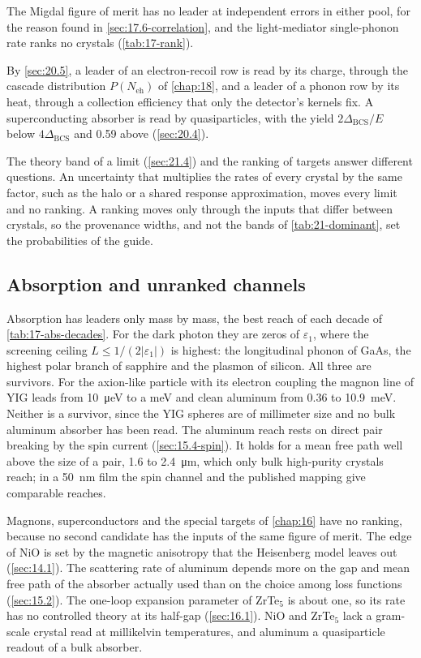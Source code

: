 The Migdal figure of merit has no leader at independent errors in either pool, for the reason found in \cref{sec:17.6-correlation}, and the light-mediator single-phonon rate ranks no crystals (\cref{tab:17-rank}).

By \cref{sec:20.5}, a leader of an electron-recoil row is read by its charge, through the cascade distribution $P(N_{\mathrm{eh}})$ of \cref{chap:18}, and a leader of a phonon row by its heat, through a collection efficiency that only the detector's kernels fix. A superconducting absorber is read by quasiparticles, with the yield $2\Delta_{\mathrm{BCS}}/E$ below $4\Delta_{\mathrm{BCS}}$ and 0.59 above (\cref{sec:20.4}).

The theory band of a limit (\cref{sec:21.4}) and the ranking of targets answer different questions. An uncertainty that multiplies the rates of every crystal by the same factor, such as the halo or a shared response approximation, moves every limit and no ranking. A ranking moves only through the inputs that differ between crystals, so the provenance widths, and not the bands of \cref{tab:21-dominant}, set the probabilities of the guide.

\subsection{Absorption and unranked channels}\label{sec:21.7-other}

Absorption has leaders only mass by mass, the best reach of each decade of \cref{tab:17-abs-decades}. For the dark photon they are zeros of $\varepsilon_1$, where the screening ceiling $L \le 1/(2|\varepsilon_1|)$ is highest: the longitudinal phonon of GaAs, the highest polar branch of sapphire and the plasmon of silicon. All three are survivors. For the axion-like particle with its electron coupling the magnon line of YIG leads from 10~\si{\micro eV} to a meV and clean aluminum from 0.36 to \SI{10.9}{meV}. Neither is a survivor, since the YIG spheres are of millimeter size and no bulk aluminum absorber has been read. The aluminum reach rests on direct pair breaking by the spin current (\cref{sec:15.4-spin}). It holds for a mean free path well above the size of a pair, 1.6 to \SI{2.4}{\micro m}, which only bulk high-purity crystals reach; in a \SI{50}{nm} film the spin channel and the published mapping give comparable reaches.

Magnons, superconductors and the special targets of \cref{chap:16} have no ranking, because no second candidate has the inputs of the same figure of merit. The edge of NiO is set by the magnetic anisotropy that the Heisenberg model leaves out (\cref{sec:14.1}). The scattering rate of aluminum depends more on the gap and mean free path of the absorber actually used than on the choice among loss functions (\cref{sec:15.2}). The one-loop expansion parameter of ZrTe$_5$ is about one, so its rate has no controlled theory at its half-gap (\cref{sec:16.1}). NiO and ZrTe$_5$ lack a gram-scale crystal read at millikelvin temperatures, and aluminum a quasiparticle readout of a bulk absorber.

